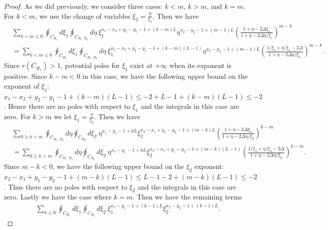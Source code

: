 \documentclass[10pt,a4paper]{amsart}
\begin{document}
\begin{proof}
As we did previously, we consider three cases: $k<m$, $k>m$, and $k=m$. For $k<m$, we use the change of variables $\xi_2=\frac{\eta}{\xi_1}$. Then we have 
\begin{equation}
    \begin{split}
        &\sum_{k<m\leq 0} \oint_{C_{R_1}}d\xi_1\oint_{C_{R_1\cdot R_2}}d\eta \ \xi_1^{x_1-x_2+y_2-y_1-1+(k-m)L} \eta^{x_2-y_2-1+(m-1)L}\left(\frac{1+\eta-2\Delta\xi_1}{1+\eta-2\Delta\eta/\xi_1} \right)^{m-k} \\
        &=\sum_{k<m\leq0} \oint_{C_{R_1}}d\xi_1\oint_{C_{R_1\cdot R_2}}d\eta \ \xi_1^{x_1-x_2+y_2-y_1-1+(k-m)(L-1)} \eta^{x_2-y_2-1+(m-1)L}\left(\frac{1/\xi_1+\eta/\xi_1-2\Delta}{1+\eta-2\Delta\eta/\xi_1} \right)^{m-k}.
    \end{split}
\end{equation}
 Since $r(C_{R_1})>1$, potential poles for $\xi_1$ exist at $+\infty$ when its exponent is positive. Since $k-m<0$ in this case, we have the following upper bound on the exponent of $\xi_1$: $x_1-x_2+y_2-y_1-1+(k-m)(L-1)\leq -2 + L-1 +(k-m)(L-1) \leq -2$. Hence there are no poles with respect to $\xi_1$ and the integrals in this case are zero. For $k>m$ we let $\xi_1=\frac{\eta}{\xi_2}$. Then we have 
\begin{equation}
    \begin{split}
        &\sum_{0\geq k>m} \oint_{C_{R_1 \cdot R_2}}d\eta\oint_{C_{R_2}}d\xi_2 \ \eta^{x_1-y_1-1+kL} \xi_2^{x_2-x_1+y_1-y_2-1+(m-k)L}\left(\frac{1+\eta-2\Delta\xi_2}{1+\eta-2\Delta\eta/\xi_2} \right)^{k-m} \\
        &= \sum_{0\geq k>m} \oint_{C_{R_1\cdot R_1}}d\eta\oint_{C_{R_2}}d\xi_2 \ \eta^{x_1-y_1-1+kL} \xi_2^{x_2-x_1+y_1-y_2-1+(m-k)(L-1)}\left(\frac{1/\xi_2+\eta/\xi_2-2\Delta}{1+\eta-2\Delta\eta/\xi_2} \right)^{k-m}.
    \end{split}
\end{equation}
Since $m-k<0$, we have the following upper bound on the $\xi_2$ exponent: $x_2-x_1+y_1-y_2-1+(m-k)(L-1)\leq L-1 - 2 + (m-k)(L-1) \leq -2$. Thus there are no poles with respect to $\xi_2$ and the integrals in this case are zero. Lastly we have the case where $k=m$. Then we have the remaining terms 
\begin{equation}
    \begin{split}
        \sum_{k\leq 0}\oint_{C_{R_1}}d\xi_1 \oint_{C_{R_2}}d\xi_2 \ \xi_1^{x_1-y_1 - 1 +(k-1)L}\xi_2^{x_2-y_2-1+(k-1)L}.
    \end{split}
\end{equation}


\end{proof}
\end{document}
